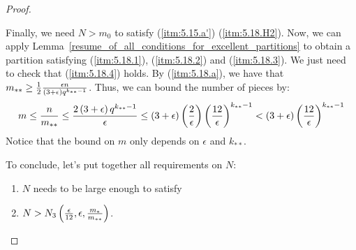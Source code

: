 \begin{proof}
\begin{itemize}[label={}]
            \end{itemize}
            Finally, we need $N > m_0$ to satisfy (\ref{itm:5.15.a'}) (\ref{itm:5.18.H2}).
            Now, we can apply Lemma~\ref{resume_of_all_conditions_for_excellent_partitions} to obtain a partition
            satisfying (\ref{itm:5.18.1}), (\ref{itm:5.18.2}) and (\ref{itm:5.18.3}).
            We just need to check that (\ref{itm:5.18.4}) holds.
            By (\ref{itm:5.18.a}), we have that $m_{**} \geq \frac{1}{2} \frac{\epsilon n}{\left( 3 + \epsilon \right)q^{k_{**}-1}}$.
            Thus, we can bound the number of pieces by:
            $$
                m \leq \frac{n}{m_{**}} \leq \frac{2 \left( 3 + \epsilon \right) q^{k_{**}-1}}{\epsilon} \leq
                    \left( 3 + \epsilon \right) \left( \frac{2}{\epsilon} \right) \left( \frac{12}{\epsilon} \right)^{k_{**}-1} <
                    \left( 3 + \epsilon \right) \left( \frac{12}{\epsilon} \right)^{k_{**}-1}
            $$
            Notice that the bound on $m$ only depends on $\epsilon$ and $k_{**}$.

            To conclude, let's put together all requirements on $N$:
            \begin{enumerate}[label=(H\arabic*), ref=H\arabic*]
                \item \label{itm:5.18.H1} $N$ needs to be large enough to satisfy
                \item \label{itm:5.18.H2} $N > N_3\left( \frac{\epsilon}{12}, \epsilon, \frac{m_*}{m_{**}} \right)$.
            \end{enumerate}
        \end{proof}

